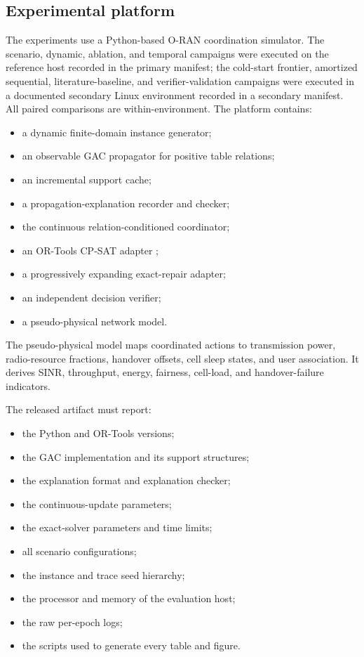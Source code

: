 \documentclass[pdflatex,sn-mathphys-num,iicol,oneside]{sn-jnl}
\begin{document}
\subsection{Experimental platform}

The experiments use a Python-based O-RAN coordination simulator. The
scenario, dynamic, ablation, and temporal campaigns were executed on
the reference host recorded in the primary manifest; the cold-start
frontier, amortized sequential, literature-baseline, and
verifier-validation campaigns were executed in a documented secondary
Linux environment recorded in a secondary manifest. All paired
comparisons are within-environment. The platform contains:

\begin{itemize}
    \item a dynamic finite-domain instance generator;
    \item an observable GAC propagator for positive table relations;
    \item an incremental support cache;
    \item a propagation-explanation recorder and checker;
    \item the continuous relation-conditioned coordinator;
    \item an OR-Tools CP-SAT adapter
    \cite{ortools,perron2023cpsat};
    \item a progressively expanding exact-repair adapter;
    \item an independent decision verifier;
    \item a pseudo-physical network model.
\end{itemize}

The pseudo-physical model maps coordinated actions to transmission
power, radio-resource fractions, handover offsets, cell sleep states,
and user association. It derives SINR, throughput, energy, fairness,
cell-load, and handover-failure indicators.

The released artifact must report:

\begin{itemize}
    \item the Python and OR-Tools versions;
    \item the GAC implementation and its support structures;
    \item the explanation format and explanation checker;
    \item the continuous-update parameters;
    \item the exact-solver parameters and time limits;
    \item all scenario configurations;
    \item the instance and trace seed hierarchy;
    \item the processor and memory of the evaluation host;
    \item the raw per-epoch logs;
    \item the scripts used to generate every table and figure.
\end{itemize}
\end{document}
